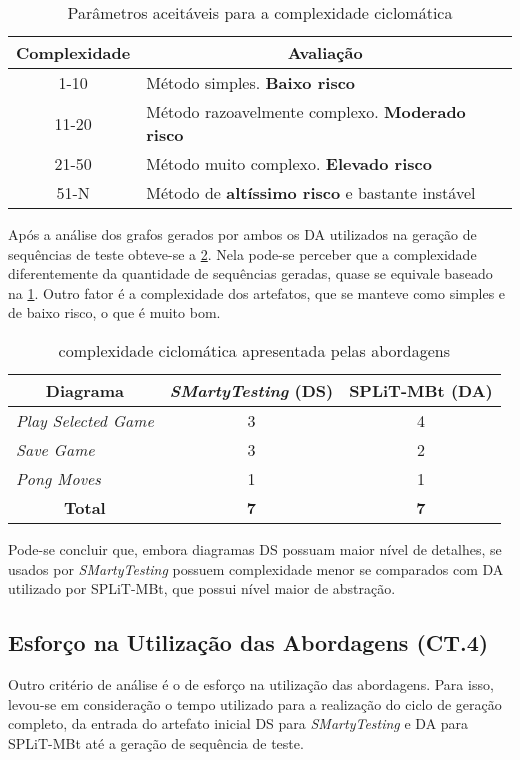\begin{table}[H]
	\centering
	\caption{Parâmetros aceitáveis para a complexidade ciclomática}
	\label{tab:ciclomaticotabelarisco}
	\begin{tabular}{c|l}
		\hline
		\textbf{Complexidade} & \multicolumn{1}{c}{\textbf{Avaliação}} \\ \hline
		1-10 & Método simples. \textbf{Baixo risco} \\ \hline
		11-20 & Método razoavelmente complexo. \textbf{Moderado risco} \\ \hline
		21-50 & Método muito complexo. \textbf{Elevado risco} \\ \hline
		51-N & Método de \textbf{altíssimo risco} e bastante instável \\ \hline
	\end{tabular}
\end{table}

Após a análise dos grafos gerados por ambos os DA utilizados na geração de sequências de teste obteve-se a \ref{tab:ciclomatico_gerado}. Nela pode-se perceber que a complexidade diferentemente da quantidade de sequências geradas, quase se equivale baseado na \ref{tab:ciclomaticotabelarisco}. Outro fator é a complexidade dos artefatos, que se manteve como simples e de baixo risco, o que é muito bom.

\begin{table}[H]
	\centering
	\caption{complexidade ciclomática apresentada pelas abordagens}
	\label{tab:ciclomatico_gerado}
	\begin{tabular}{l|c|c}
		\hline
		\multicolumn{1}{c|}{\textbf{Diagrama}} & \textbf{\textit{SMartyTesting} (DS)} & \textbf{SPLiT-MBt (DA)} \\ \hline
		\textit{Play Selected Game} & 3 & 4 \\ \hline
		\textit{Save Game} & 3 & 2 \\ \hline
		\textit{Pong Moves} & 1 & 1 \\ \hline
		\multicolumn{1}{c|}{\textbf{Total}} & \textbf{7} & \textbf{7} \\ \hline
	\end{tabular}
\end{table}

Pode-se concluir que, embora diagramas DS possuam maior nível de detalhes, se usados por \textit{SMartyTesting} possuem complexidade menor se comparados com DA utilizado por SPLiT-MBt, que possui nível maior de abstração.


\subsection{Esforço na Utilização das Abordagens (CT.4)}
Outro critério de análise é o de esforço na utilização das abordagens. Para isso, levou-se em consideração o tempo utilizado para a realização do ciclo de geração completo, da entrada do artefato inicial DS para \textit{SMartyTesting} e DA para SPLiT-MBt até a geração de sequência de teste.

